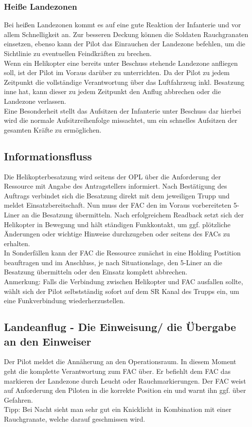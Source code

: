 \subsubsection{Heiße Landezonen}
Bei heißen Landezonen kommt es auf eine gute Reaktion der Infanterie und vor allem 
Schnelligkeit an. Zur besseren Deckung können die Soldaten Rauchgranaten einsetzen,  
ebenso kann der Pilot das Einrauchen der Landezone befehlen, um die Sichtlinie zu  
eventuellen Feindkräften zu brechen.\\
Wenn ein Helikopter eine bereits unter Beschuss stehende Landezone anfliegen soll, ist der 
Pilot im Voraus darüber zu unterrichten. Da der Pilot zu jedem Zeitpunkt die vollständige 
Verantwortung über das Luftfahrzeug inkl. Besatzung inne hat, kann dieser zu jedem  
Zeitpunkt den Anflug abbrechen oder die Landezone verlassen.\\
Eine Besonderheit stellt das Aufsitzen der Infanterie unter Beschuss dar hierbei wird die  
normale Aufsitzreihenfolge missachtet, um ein schnelles Aufsitzen der gesamten Kräfte zu 
ermöglichen.

\subsection{Informationsfluss}
Die Helikopterbesatzung wird seitens der OPL über die Anforderung der Ressource mit 
Angabe des Antragstellers informiert. Nach Bestätigung des Auftrags verbindet sich die 
Besatzung direkt mit dem jeweiligen Trupp und meldet Einsatzbereitschaft. Nun muss der  
FAC den im Voraus vorbereiteten 5-Liner an die Besatzung übermitteln. Nach erfolgreichem 
Readback setzt sich der Helikopter in Bewegung und hält ständigen Funkkontakt, um ggf.  
plötzliche Änderungen oder wichtige Hinweise durchzugeben oder seitens des FACs zu  
erhalten.\\
 
In Sonderfällen kann der FAC die Ressource zunächst in eine Holding Postition beauftragen  
und im Anschluss, je nach Situationslage, den 5-Liner an die Besatzung übermitteln oder  
den Einsatz komplett abbrechen.\\
 
Anmerkung: Falls die Verbindung zwischen Helikopter und FAC ausfallen sollte, wählt sich 
der Pilot selbstständig sofort auf dem SR Kanal des Trupps ein, um eine Funkverbindung 
wiederherzustellen.

\subsection{Landeanflug - Die Einweisung/ die Übergabe an den Einweiser}
Der Pilot meldet die Annäherung an den Operationsraum. In diesem Moment geht die 
komplette Verantwortung zum FAC über. Er befiehlt dem FAC das markieren der Landezone 
durch Leucht oder Rauchmarkierungen. Der FAC weist auf Anforderung den Piloten in die 
korrekte Position ein und warnt ihn ggf. über Gefahren.\\
Tipp: Bei Nacht sieht man sehr gut ein Knicklicht in Kombination mit einer Rauchgranate, 
welche darauf geschmissen wird.\\
 
